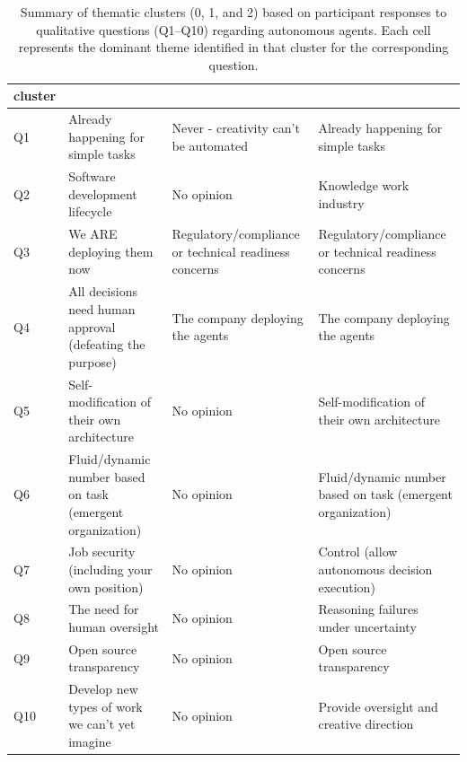 \documentclass{article}
\begin{document}
\begin{table}[htbp]
\caption{Summary of thematic clusters (0, 1, and 2) based on participant responses to qualitative questions (Q1--Q10) regarding autonomous agents. Each cell represents the dominant theme identified in that cluster for the corresponding question.}
\centering
\begin{tabularx}{\textwidth}{l>{\raggedright\arraybackslash}X >{\raggedright\arraybackslash}X >{\raggedright\arraybackslash}X}
\toprule
cluster & 0 & 1 & 2 \\
\midrule
Q1 & Already happening for simple tasks & Never - creativity can't be automated & Already happening for simple tasks \\
Q2 & Software development lifecycle & No opinion & Knowledge work industry \\
Q3 & We ARE deploying them now & Regulatory/compliance or technical readiness concerns & Regulatory/compliance or technical readiness concerns \\
Q4 & All decisions need human approval (defeating the purpose) & The company deploying the agents & The company deploying the agents \\
Q5 & Self-modification of their own architecture & No opinion & Self-modification of their own architecture \\
Q6 & Fluid/dynamic number based on task (emergent organization) & No opinion & Fluid/dynamic number based on task (emergent organization) \\
Q7 & Job security (including your own position) & No opinion & Control (allow autonomous decision execution) \\
Q8 & The need for human oversight & No opinion & Reasoning failures under uncertainty \\
Q9 & Open source transparency & No opinion & Open source transparency \\
Q10 & Develop new types of work we can't yet imagine & No opinion & Provide oversight and creative direction \\
\bottomrule
\end{tabularx}
\end{table}
\end{document}
